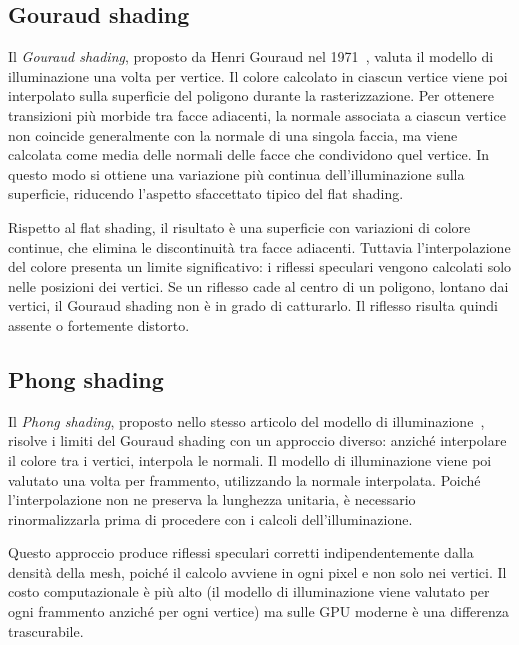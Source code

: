 \documentclass[12pt,a4paper,twoside]{book}
\begin{document}
\subsection{Gouraud shading}
\label{subsec:gouraud}

Il \textit{Gouraud shading}, proposto da Henri Gouraud nel 1971~\cite{gouraud1971}, valuta il modello di illuminazione una volta per vertice. Il colore calcolato in ciascun vertice viene poi interpolato sulla superficie del poligono durante la rasterizzazione. Per ottenere transizioni più morbide tra facce adiacenti, la normale associata a ciascun vertice non coincide generalmente con la normale di una singola faccia, ma viene calcolata come media delle normali delle facce che condividono quel vertice. In questo modo si ottiene una variazione più continua dell'illuminazione sulla superficie, riducendo l'aspetto sfaccettato tipico del flat shading.

Rispetto al flat shading, il risultato è una superficie con variazioni di colore continue, che elimina le discontinuità tra facce adiacenti. Tuttavia l'interpolazione del colore presenta un limite significativo: i riflessi speculari vengono calcolati solo nelle posizioni dei vertici. Se un riflesso cade al centro di un poligono, lontano dai vertici, il Gouraud shading non è in grado di catturarlo. Il riflesso risulta quindi assente o fortemente distorto.

\subsection{Phong shading}
\label{subsec:phong-shading}

Il \textit{Phong shading}, proposto nello stesso articolo del modello di illuminazione~\cite{phong1975}, risolve i limiti del Gouraud shading con un approccio diverso: anziché interpolare il colore tra i vertici, interpola le normali. Il modello di illuminazione viene poi valutato una volta per frammento, utilizzando la normale interpolata. Poiché l'interpolazione non ne preserva la lunghezza unitaria, è necessario rinormalizzarla prima di procedere con i calcoli dell'illuminazione.

Questo approccio produce riflessi speculari corretti indipendentemente dalla densità della mesh, poiché il calcolo avviene in ogni pixel e non solo nei vertici. Il costo computazionale è più alto (il modello di illuminazione viene valutato per ogni frammento anziché per ogni vertice) ma sulle GPU moderne è una differenza trascurabile.
\end{document}
